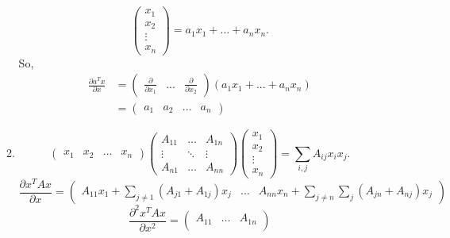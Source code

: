 \documentclass[11pt]{article}
\begin{document}
\begin{enumerate}
\begin{enumerate}
\[      \begin{pmatrix}
        x_1\\
        x_2\\
        \vdots\\
        x_n
      \end{pmatrix} = a_1x_1 + ... + a_nx_n.\]
      So,
      \begin{align*}
        \frac{\partial a^Tx}{\partial x} &=
        \begin{pmatrix}
          \frac{\partial}{\partial x_1} &... &\frac{\partial}{\partial x_2}
        \end{pmatrix} (a_1x_1 + ... + a_nx_n)\\
        &= \begin{pmatrix} a_1 &a_2 &\dots &a_n \end{pmatrix}
      \end{align*}
    \item
      \begin{equation*}
        \begin{pmatrix}
          x_1 &x_2 &\dots &x_n         
        \end{pmatrix}
        \begin{pmatrix}
          A_{11} &\dots &A_{1n}\\
          \vdots &\ddots &\vdots\\
          A_{n1} &\dots &A_{nn}          
        \end{pmatrix}
        \begin{pmatrix}
          x_1 \\
          x_2 \\
          \vdots \\
          x_n         
        \end{pmatrix} =
        \sum_{i, j} A_{ij} x_i x_j.
      \end{equation*}
      \begin{equation*}
        \frac{\partial x^T A x}{\partial x} =
        \begin{pmatrix}
          A_{11}x_1 + \sum_{j \neq 1}(A_{j1} + A_{1j}) x_j
          &\dots
          &A_{nn}x_n + \sum_{j \neq n}\sum_j (A_{jn} + A_{nj}) x_j
        \end{pmatrix}
      \end{equation*}
      \begin{equation*}
        \frac{\partial^2 x^T A x}{\partial x^2} =
        \begin{pmatrix}
          A_{11} &\dots &A_{1n}\\

\end{pmatrix}
\end{equation*}
\end{enumerate}
\end{enumerate}
\end{document}

